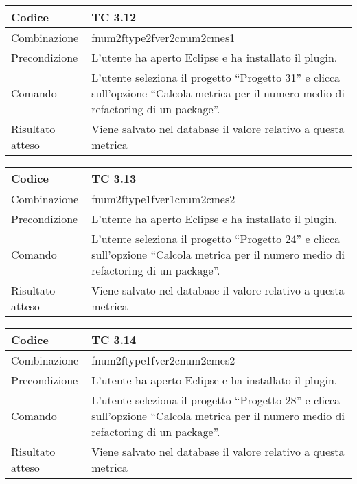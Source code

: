 \begin{table}[ht]
\begin{tabular}{|p{3cm}|p{9cm}|}
\hline
\cellcolor{lightgray}Codice				& TC 3.12								\\
\hline
\cellcolor{lightgray}Combinazione		& fnum2ftype2fver2cnum2cmes1 									\\
\hline
\cellcolor{lightgray}Precondizione		& L'utente ha aperto Eclipse e ha installato il plugin.				\\
\hline 
\cellcolor{lightgray}Comando 			& L'utente seleziona il progetto ``Progetto 31''  e clicca sull'opzione ``Calcola metrica per il numero medio di refactoring di un package''.	\\
\hline
\cellcolor{lightgray}Risultato atteso	& Viene salvato nel database il valore relativo a questa metrica	\\
\hline
\end{tabular}
\end{table}

\begin{table}[ht]
\begin{tabular}{|p{3cm}|p{9cm}|}
\hline
\cellcolor{lightgray}Codice				& TC 3.13								\\
\hline
\cellcolor{lightgray}Combinazione		& fnum2ftype1fver1cnum2cmes2 									\\
\hline
\cellcolor{lightgray}Precondizione		& L'utente ha aperto Eclipse e ha installato il plugin.					\\
\hline
\cellcolor{lightgray}Comando			& L'utente seleziona il progetto ``Progetto 24''  e clicca sull'opzione ``Calcola metrica per il numero medio di refactoring di un package''.	\\
\hline
\cellcolor{lightgray}Risultato atteso	& Viene salvato nel database il valore relativo a questa metrica	\\
\hline
\end{tabular}
\end{table}

\begin{table}[ht]
\begin{tabular}{|p{3cm}|p{9cm}|}
\hline
\cellcolor{lightgray}Codice				& TC 3.14								\\
\hline
\cellcolor{lightgray}Combinazione		& fnum2ftype1fver2cnum2cmes2									\\
\hline
\cellcolor{lightgray}Precondizione		& L'utente ha aperto Eclipse e ha installato il plugin.			\\
\hline
\cellcolor{lightgray}Comando			& L'utente seleziona il progetto ``Progetto 28''  e clicca sull'opzione ``Calcola metrica per il numero medio di refactoring di un package''.	\\
\hline
\cellcolor{lightgray}Risultato atteso	& Viene salvato nel database il valore relativo a questa metrica	\\
\hline
\end{tabular}
\end{table}

